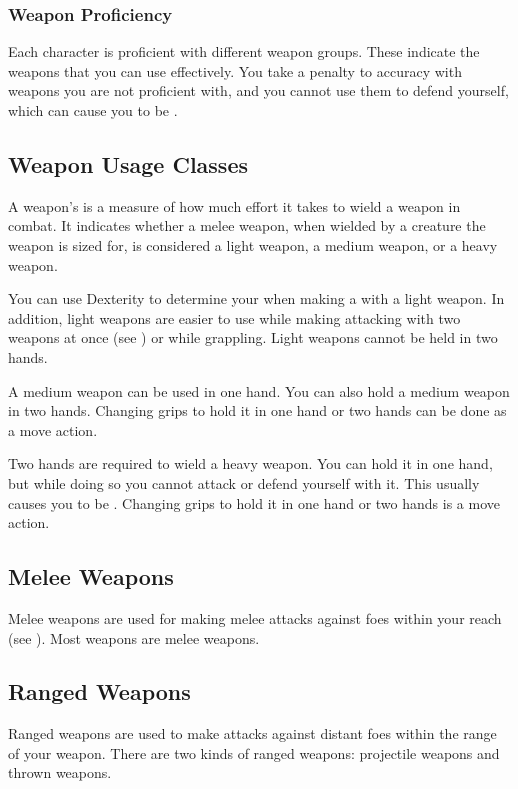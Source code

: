         \subsubsection{Weapon Proficiency}\label{Weapon Proficiency}
            Each character is proficient with different weapon groups. These indicate the weapons that you can use effectively. You take a  penalty to accuracy with weapons you are not proficient with, and you cannot use them to defend yourself, which can cause you to be .

    \subsection{Weapon Usage Classes}\label{Weapon Usage Classes}
        A weapon's  is a measure of how much effort it takes to wield a weapon in combat.
        It indicates whether a melee weapon, when wielded by a creature the weapon is sized for, is considered a light weapon, a medium weapon, or a heavy weapon.

        \label{Light Weapons} You can use Dexterity to determine your  when making a  with a light weapon.
        In addition, light weapons are easier to use while making attacking with two weapons at once (see ) or while grappling.
        Light weapons cannot be held in two hands.

         A medium weapon can be used in one hand. You can also hold a medium weapon in two hands. Changing grips to hold it in one hand or two hands can be done as a move action.

         Two hands are required to wield a heavy weapon. You can hold it in one hand, but while doing so you cannot attack or defend yourself with it. This usually causes you to be . Changing grips to hold it in one hand or two hands is a move action.


    \subsection{Melee Weapons}
        Melee weapons are used for making melee attacks against foes within your reach (see ). Most weapons are melee weapons.

    \subsection{Ranged Weapons}
        Ranged weapons are used to make attacks against distant foes within the range of your weapon. There are two kinds of ranged weapons: projectile weapons and thrown weapons.

